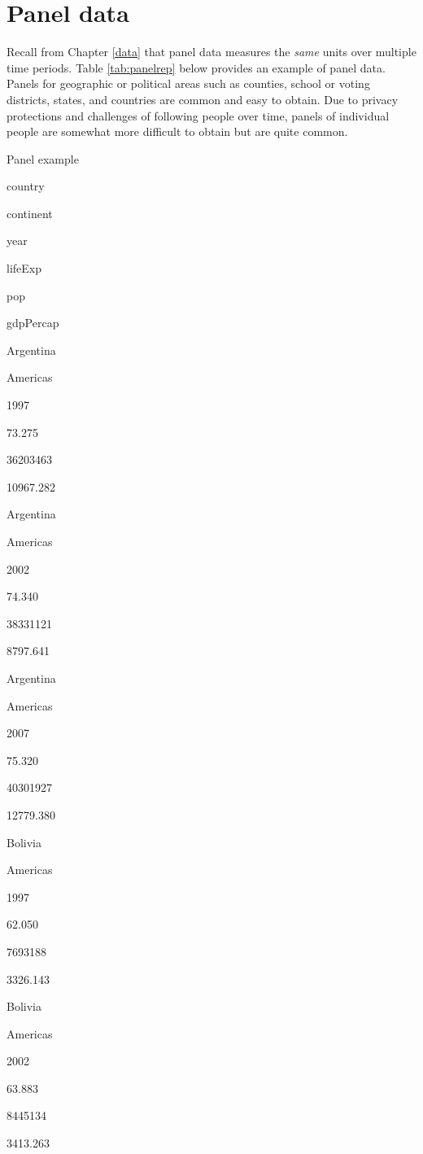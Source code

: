 \documentclass[
]{book}
\begin{document}
\hypertarget{panel-data}{%
\section{Panel data}\label{panel-data}}

Recall from Chapter \ref{data} that panel data measures the \emph{same} units over multiple time periods. Table \ref{tab:panelrep} below provides an example of panel data. Panels for geographic or political areas such as counties, school or voting districts, states, and countries are common and easy to obtain. Due to privacy protections and challenges of following people over time, panels of individual people are somewhat more difficult to obtain but are quite common.

\label{tab:panelrep}Panel example

country

continent

year

lifeExp

pop

gdpPercap

Argentina

Americas

1997

73.275

36203463

10967.282

Argentina

Americas

2002

74.340

38331121

8797.641

Argentina

Americas

2007

75.320

40301927

12779.380

Bolivia

Americas

1997

62.050

7693188

3326.143

Bolivia

Americas

2002

63.883

8445134

3413.263
\end{document}
